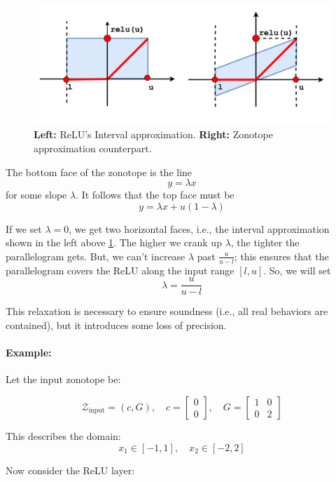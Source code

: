 \documentclass[oneside,11pt,dvipsnames]{book}
\begin{document}
\begin{figure}
    \centering
    \includegraphics[width=1\linewidth]{zonotope_vs_interval.png}
    \caption{\textbf{Left:} ReLU's Interval approximation. \textbf{Right:} Zonotope approximation counterpart.}
    \label{fig:zonotope_vs_interval}
\end{figure}


The bottom face of the zonotope is the line
\[
y = \lambda x
\]
for some slope \(\lambda\). It follows that the top face must be
\[
y = \lambda x + u(1 - \lambda)
\]

If we set \(\lambda = 0\), we get two horizontal faces, i.e., the interval approximation shown in the left above \ref{fig:zonotope_vs_interval}. The higher we crank up \(\lambda\), the tighter the parallelogram gets. But, we can’t increase \(\lambda\) past \( \frac{u}{u - l} \); this ensures that the parallelogram covers the ReLU along the input range \([l, u]\). So, we will set
\[
\lambda = \frac{u}{u - l}
\]

This relaxation is necessary to ensure soundness (i.e., all real behaviors are contained), but it introduces some loss of precision.

\paragraph{Example:} Let the input zonotope be:

\[
\mathcal{Z}_{\text{input}} = (c, G), \quad
c = \begin{bmatrix} 0 \\ 0 \end{bmatrix}, \quad
G = \begin{bmatrix} 1 & 0 \\ 0 & 2 \end{bmatrix}
\]

This describes the domain:
\[
x_1 \in [-1, 1], \quad x_2 \in [-2, 2]
\]

Now consider the ReLU layer:
\end{document}
